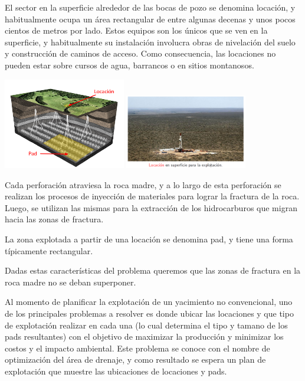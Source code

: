 \newpage
El sector en la superficie alrededor de las bocas de pozo se denomina locaci\'on, y habitualmente ocupa un \'area rectangular de entre algunas decenas y unos pocos cientos de metros por lado. Estos equipos son los \'unicos que se ven en la superficie, y habitualmente su instalaci\'on involucra obras de nivelaci\'on del suelo y construcci\'on de caminos de acceso. Como consecuencia, las locaciones no pueden estar sobre cursos de agua, barrancos o en sitios montanosos.

\begin{center}
\includegraphics[width=0.4\textwidth]{imagenes/figura2}
\includegraphics[width=0.4\textwidth]{imagenes/figura3}
\end{center}

Cada perforaci\'on atraviesa la roca madre, y a lo largo de esta perforaci\'on
se realizan los procesos de inyecci\'on de materiales para lograr la fractura de
la roca. Luego, se utilizan las mismas para la extracci\'on de los hidrocarburos
que migran hacia las zonas de fractura.

La zona
explotada a partir de una locaci\'on se denomina pad, y tiene una forma t\'ipicamente
rectangular.

Dadas estas caracter\'isticas del problema queremos que las zonas de fractura en la roca madre no se deban superponer.


Al momento de planificar la explotaci\'on de un yacimiento no convencional,
uno de los principales problemas a resolver es donde ubicar las locaciones y
que tipo de explotaci\'on realizar en cada una (lo cual determina el tipo y
tamano de los pads resultantes) con el objetivo de maximizar la producci\'on
y minimizar los costos y el impacto ambiental. Este problema se conoce con
el nombre de optimizaci\'on del \'area de drenaje, y como resultado se espera un
plan de explotaci\'on que muestre las ubicaciones de locaciones y pads.


